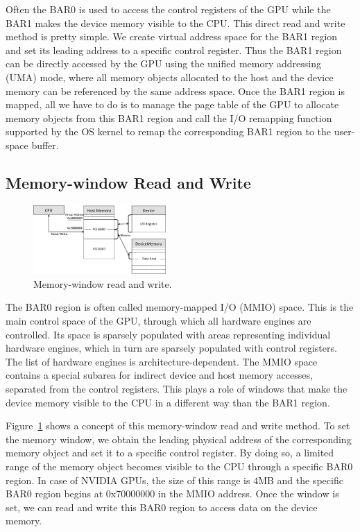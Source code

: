 Often the BAR0 is used to access the control registers of the GPU while
the BAR1 makes the device memory visible to the CPU.
This direct read and write method is pretty simple.
We create virtual address space for the BAR1 region and set its leading
address to a specific control register.
Thus the BAR1 region can be directly accessed by the GPU using the
unified memory addressing (UMA) mode, where all memory objects allocated
to the host and the device memory can be referenced by the same address
space.
Once the BAR1 region is mapped, all we have to do is to manage the page
table of the GPU to allocate memory objects from this BAR1 region and
call the I/O remapping function supported by the OS kernel to remap the
corresponding BAR1 region to the user-space buffer.

\subsection{Memory-window Read and Write}
\label{sec:memwnd}

\begin{figure}[!t]
 \centering
 \includegraphics[width=0.45\textwidth]{figure/Method/MEMWND_Method.pdf}
 \caption{Memory-window read and write.}
 \label{fig:memwnd}
\end{figure}

The BAR0 region is often called memory-mapped I/O (MMIO) space.
This is the main control space of the GPU, through which all hardware
engines are controlled.
Its space is sparsely populated with areas representing individual
hardware engines, which in turn are sparsely populated with control
registers.
The list of hardware engines is architecture-dependent.
The MMIO space contains a special subarea for indirect device and host
memory accesses, separated from the control registers.
This plays a role of windows that make the device memory visible to the
CPU in a different way than the BAR1 region.

Figure~\ref{fig:memwnd} shows a concept of this memory-window read and
write method.
To set the memory window, we obtain the leading physical address of the
corresponding memory object and set it to a specific control register.
By doing so, a limited range of the memory object becomes visible to the
CPU through a specific BAR0 region.
In case of NVIDIA GPUs, the size of this range is $4$MB and the specific
BAR0 region begins at 0x70000000 in the MMIO address.
Once the window is set, we can read and write this BAR0 region to access
data on the device memory.

